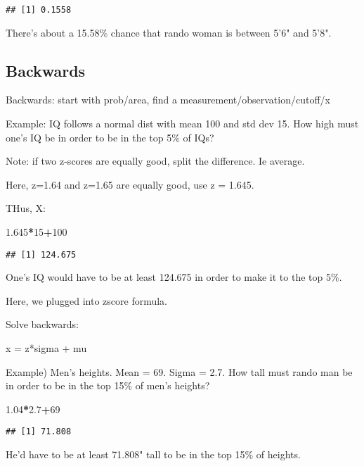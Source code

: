 \documentclass[]{article}
\newenvironment{Shaded}{\begin{snugshade}}{\end{snugshade}}
\newcommand{\DecValTok}[1]{\textcolor[rgb]{0.00,0.00,0.81}{#1}}
\newcommand{\FloatTok}[1]{\textcolor[rgb]{0.00,0.00,0.81}{#1}}
\newcommand{\OperatorTok}[1]{\textcolor[rgb]{0.81,0.36,0.00}{\textbf{#1}}}
\begin{document}
\begin{verbatim}
## [1] 0.1558
\end{verbatim}

There's about a 15.58\% chance that rando woman is between 5'6" and
5'8".

\hypertarget{backwards-1}{%
\subsection{Backwards}\label{backwards-1}}

Backwards: start with prob/area, find a measurement/observation/cutoff/x

Example: IQ follows a normal dist with mean 100 and std dev 15. How high
must one's IQ be in order to be in the top 5\% of IQs?

Note: if two z-scores are equally good, split the difference. Ie
average.

Here, z=1.64 and z=1.65 are equally good, use z = 1.645.

THus, X:

\begin{Shaded}
\begin{Highlighting}[]
\FloatTok{1.645}\OperatorTok{*}\DecValTok{15}\OperatorTok{+}\DecValTok{100}
\end{Highlighting}
\end{Shaded}

\begin{verbatim}
## [1] 124.675
\end{verbatim}

One's IQ would have to be at least 124.675 in order to make it to the
top 5\%.

Here, we plugged into zscore formula.

Solve backwards:

x = z*sigma + mu

Example) Men's heights. Mean = 69. Sigma = 2.7. How tall must rando man
be in order to be in the top 15\% of men's heights?

\begin{Shaded}
\begin{Highlighting}[]
\FloatTok{1.04}\OperatorTok{*}\FloatTok{2.7}\OperatorTok{+}\DecValTok{69}
\end{Highlighting}
\end{Shaded}

\begin{verbatim}
## [1] 71.808
\end{verbatim}

He'd have to be at least 71.808" tall to be in the top 15\% of heights.
\end{document}
